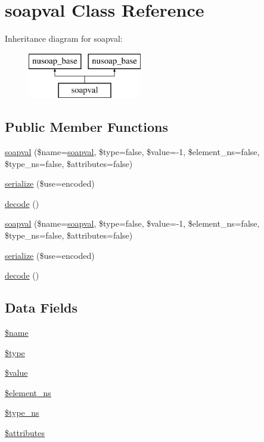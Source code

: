 \hypertarget{classsoapval}{}\section{soapval Class Reference}
\label{classsoapval}
Inheritance diagram for soapval\+:\begin{figure}[H]
\begin{center}
\leavevmode
\includegraphics[height=2.000000cm]{classsoapval}
\end{center}
\end{figure}
\subsection*{Public Member Functions}
\begin{DoxyCompactItemize}
\item 
\hyperlink{classsoapval_a03fb2cf9de082b67bf1193ab47f60a75}{soapval} (\$name=\textquotesingle{}\hyperlink{classsoapval}{soapval}\textquotesingle{}, \$type=false, \$value=-\/1, \$element\+\_\+ns=false, \$type\+\_\+ns=false, \$attributes=false)
\item 
\hyperlink{classsoapval_abd6b085523c68ec1e7c6f3690ad68062}{serialize} (\$use=\textquotesingle{}encoded\textquotesingle{})
\item 
\hyperlink{classsoapval_a9a65d563b072e1f019552eaa399e98f3}{decode} ()
\item 
\hyperlink{classsoapval_a03fb2cf9de082b67bf1193ab47f60a75}{soapval} (\$name=\textquotesingle{}\hyperlink{classsoapval}{soapval}\textquotesingle{}, \$type=false, \$value=-\/1, \$element\+\_\+ns=false, \$type\+\_\+ns=false, \$attributes=false)
\item 
\hyperlink{classsoapval_abd6b085523c68ec1e7c6f3690ad68062}{serialize} (\$use=\textquotesingle{}encoded\textquotesingle{})
\item 
\hyperlink{classsoapval_a9a65d563b072e1f019552eaa399e98f3}{decode} ()
\end{DoxyCompactItemize}
\subsection*{Data Fields}
\begin{DoxyCompactItemize}
\item 
\hyperlink{classsoapval_ab2fc40d43824ea3e1ce5d86dee0d763b}{\$name}
\item 
\hyperlink{classsoapval_a9a4a6fba2208984cabb3afacadf33919}{\$type}
\item 
\hyperlink{classsoapval_a0f298096f322952a72a50f98a74c7b60}{\$value}
\item 
\hyperlink{classsoapval_a04cba769bc1831fc7cd204c05a0f7875}{\$element\+\_\+ns}
\item 
\hyperlink{classsoapval_a8595956048ac26a31428d576a6efbb6d}{\$type\+\_\+ns}
\item 
\hyperlink{classsoapval_adc851f7a62250e75df0490c0280aef4c}{\$attributes}
\end{DoxyCompactItemize}


